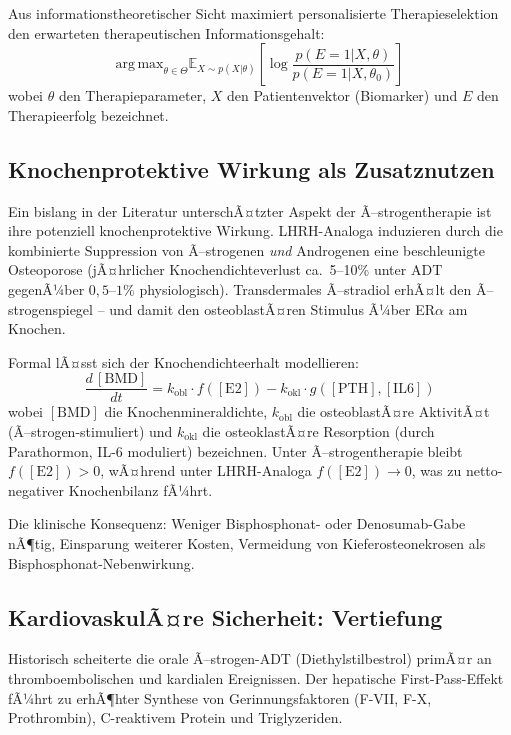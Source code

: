 ﻿\documentclass[a4paper,12pt]{article}
\theoremstyle{definition}
\begin{document}
Aus informationstheoretischer Sicht maximiert personalisierte Therapieselektion den erwarteten therapeutischen Informationsgehalt:
\begin{equation}
  \mathrm{arg\,max}_{\theta \in \Theta} \mathbb{E}_{X \sim p(X|\theta)} \left[\log \frac{p(E=1 | X, \theta)}{p(E=1 | X, \theta_0)}\right]
\end{equation}
wobei $\theta$ den Therapieparameter, $X$ den Patientenvektor (Biomarker) und $E$ den Therapieerfolg bezeichnet.

\subsection{Knochenprotektive Wirkung als Zusatznutzen}

Ein bislang in der Literatur unterschÃ¤tzter Aspekt der Ã–strogentherapie ist ihre potenziell knochenprotektive Wirkung.
LHRH-Analoga induzieren durch die kombinierte Suppression von Ã–strogenen \textit{und} Androgenen eine beschleunigte Osteoporose (jÃ¤hrlicher Knochendichteverlust ca.\ 5--10\% unter ADT gegenÃ¼ber $0{,}5$--$1\%$ physiologisch).
Transdermales Ã–stradiol erhÃ¤lt den Ã–strogenspiegel -- und damit den osteoblastÃ¤ren Stimulus Ã¼ber ER$\alpha$ am Knochen.

Formal lÃ¤sst sich der Knochendichteerhalt modellieren:
\begin{equation}
  \frac{d\,[\mathrm{BMD}]}{dt} = k_{\mathrm{obl}} \cdot f([\mathrm{E2}]) - k_{\mathrm{okl}} \cdot g([\mathrm{PTH}], [\mathrm{IL6}])
\end{equation}
wobei $[\mathrm{BMD}]$ die Knochenmineraldichte, $k_{\mathrm{obl}}$ die osteoblastÃ¤re AktivitÃ¤t (Ã–strogen-stimu\-liert) und $k_{\mathrm{okl}}$ die osteoklastÃ¤re Resorption (durch Parathormon, IL-6 moduliert) bezeichnen.
Unter Ã–strogentherapie bleibt $f([\mathrm{E2}]) > 0$, wÃ¤hrend unter LHRH-Analoga $f([\mathrm{E2}]) \to 0$, was zu netto-negativer Knochenbilanz fÃ¼hrt.

Die klinische Konsequenz: Weniger Bisphosphonat- oder Denosumab-Gabe nÃ¶tig, Einsparung weiterer Kosten, Vermeidung von Kieferosteonekrosen als Bisphosphonat-Nebenwirkung.

\subsection{KardiovaskulÃ¤re Sicherheit: Vertiefung}

Historisch scheiterte die orale Ã–strogen-ADT (Diethylstilbestrol) primÃ¤r an thromboembolischen und kardialen Ereignissen.
Der hepatische First-Pass-Effekt fÃ¼hrt zu erhÃ¶hter Synthese von Gerinnungsfaktoren (F-VII, F-X, Prothrombin), C-reaktivem Protein und Triglyzeriden.
\end{document}
